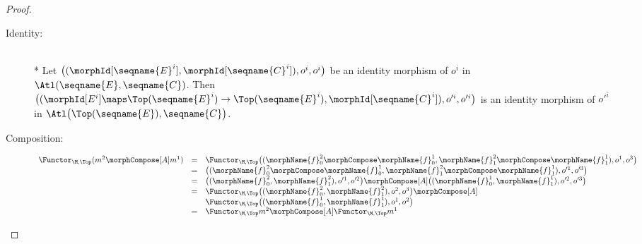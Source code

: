 \documentclass{article}
\begin{document}
\begin{theorem}
\begin{proof}
\begin{description}
\item[Identity:]
\leavevmode \\*
Let
$
  \bigl (
    (\morphId[{\seqname{E}^i}], \morphId[{\seqname{C}^i}]),
   o^i,
   o^i
  \bigr )
$
be an identity morphism of
$o^i$ in $\Atl(\seqname{E}, \seqname{C})$.
Then
$
  \bigl (
    (
      \morphId[E^i] \maps \Top(\seqname{E}^i) \to \Top(\seqname{E}^i),
      \morphId[{\seqname{C}^i}]
    ),
    o'^i,
    o'^i
  \bigr )
$
is an identity morphism of $o'^i$ in $\Atl \bigl ( \Top(\seqname{E}), \seqname{C} \bigr )$.

\item[Composition:]
\begin{equation*}
\begin{array}{lll}
  \Functor_{\M,\Top} (m^2 \morphCompose[A] m^1)
  & =
  &
  \Functor_{\M,\Top}
    \bigl (
      (
        \morphName{f}_0^2 \morphCompose \morphName{f}_0^1,
        \morphName{f}_1^2 \morphCompose \morphName{f}_1^1
      ),
      o^1,
      o^3
    \bigr )
\\*
  & =
  &
    \bigl (
      (
        \morphName{f}_0^2 \morphCompose \morphName{f}_0^1,
        \morphName{f}_1^2 \morphCompose \morphName{f}_1^1
      ),
      o'^1,
      o'^3
    \bigr )
\\*
  & =
  &
    \bigl (
      (\morphName{f}_0^2, \morphName{f}_1^2),
      o'^1,
      o'^2
    \bigr )
    \morphCompose[A]
    \bigl (
      (\morphName{f}_0^1, \morphName{f}_1^1),
      o'^2,
      o'^3
    \bigr )
\\*
  & =
  &
  \Functor_{\M,\Top}
    \bigl (
      (\morphName{f}_0^2, \morphName{f}_1^2),
      o^2,
      o^3
    \bigr )
  \morphCompose[A]
\\*
  &
  &
    \Functor_{\M,\Top}
    \bigl (
      (\morphName{f}_0^1, \morphName{f}_1^1),
      o^1,
      o^2
    \bigr )
\\*
  & =
  &
  \Functor_{\M,\Top} m^2
  \morphCompose[A]
  \Functor_{\M,\Top} m^1
\end{array}
\end{equation*}
\end{description}
\end{proof}
\end{theorem}
\end{document}
